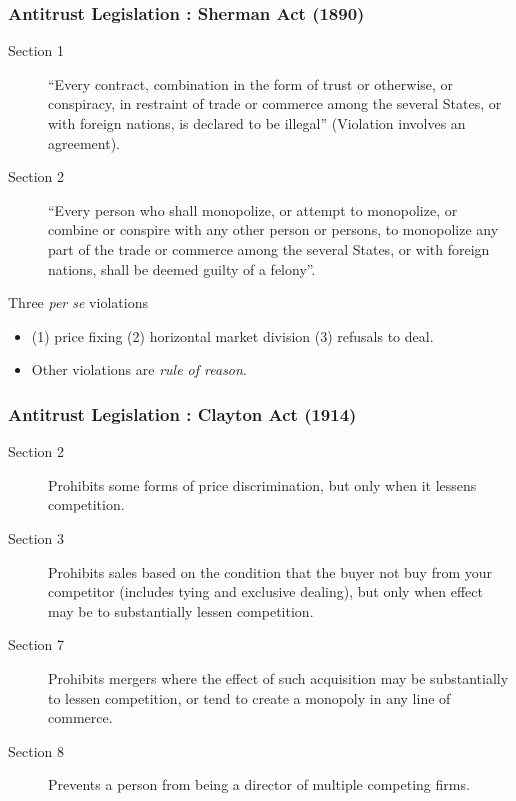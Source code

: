 \begin{frame}
\frametitle{Antitrust Legislation : Sherman Act (1890)}
 \begin{description}
\item [Section 1]``Every contract, combination in the form of trust or otherwise, or conspiracy, in restraint of trade or commerce among the several States, or with foreign nations, is declared to be illegal'' (Violation involves an \alert{agreement}).
\item [Section 2] ``Every person who shall monopolize, or attempt to monopolize, or combine or conspire with any other person or persons, to monopolize any part of the trade or commerce among the several States, or with foreign nations, shall be deemed guilty of a felony''.
 \end{description}
 Three \textit{per se} violations
 \begin{itemize}
 \item (1) price fixing (2) horizontal market division (3) refusals to deal.
 \item Other violations are \textit{rule of reason}.
 \end{itemize}
 
\end{frame}

\begin{frame}
\frametitle{Antitrust Legislation : Clayton Act (1914)}
 \begin{description}
\item [Section 2] Prohibits some forms of price discrimination, but only when it lessens competition.
\item [Section 3] Prohibits sales based on the condition that the buyer not buy from your competitor (includes tying and exclusive dealing), but only when effect may be to substantially lessen competition.
\item [Section 7] Prohibits mergers where the effect of such acquisition may be substantially to lessen competition, or tend to create a monopoly in any line of commerce.
\item [Section 8] Prevents a person from being a director of multiple competing firms.
 \end{description}
\end{frame}

